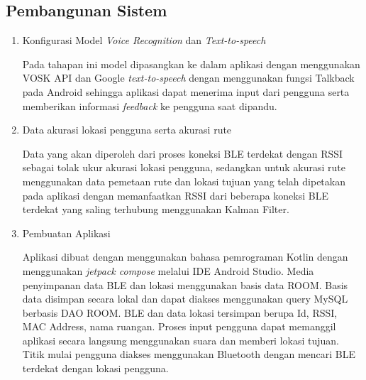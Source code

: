 \subsection{Pembangunan Sistem}
	\begin{enumerate}
	
	\item Konfigurasi Model \textit{Voice Recognition} dan \textit{Text-to-speech}
	\par Pada tahapan ini model dipasangkan ke dalam aplikasi dengan menggunakan VOSK API dan Google \textit{text-to-speech} dengan menggunakan fungsi Talkback pada Android sehingga aplikasi dapat menerima input dari pengguna serta memberikan informasi \textit{feedback} ke pengguna saat dipandu.
	
	\newpage
	\item  Data akurasi lokasi pengguna serta akurasi rute
\par Data yang akan diperoleh dari proses koneksi BLE terdekat dengan RSSI sebagai tolak ukur akurasi lokasi pengguna, sedangkan untuk akurasi rute menggunakan data pemetaan rute dan lokasi tujuan yang telah dipetakan pada aplikasi dengan memanfaatkan RSSI dari beberapa koneksi BLE terdekat yang saling terhubung menggunakan Kalman Filter.

	\item Pembuatan Aplikasi
	\par Aplikasi dibuat dengan menggunakan bahasa pemrograman Kotlin dengan menggunakan \textit{jetpack compose} melalui IDE Android Studio. Media penyimpanan data BLE dan lokasi menggunakan basis data ROOM. Basis data disimpan secara lokal dan dapat diakses menggunakan query MySQL berbasis DAO ROOM. BLE dan data lokasi tersimpan berupa Id, RSSI, MAC Address, nama ruangan. Proses input pengguna dapat memanggil aplikasi secara langsung menggunakan suara dan memberi lokasi tujuan. Titik mulai pengguna diakses menggunakan Bluetooth dengan mencari BLE terdekat dengan lokasi pengguna.
	

\end{enumerate}
